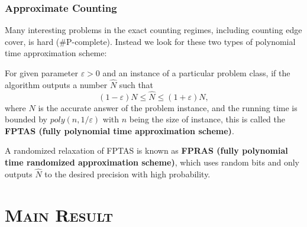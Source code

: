 \documentclass[mathserif]{beamer}
\newcommand{\eps}{\varepsilon}
\begin{document}
\begin{frame}
	\frametitle{Approximate Counting}
	Many interesting problems in the exact counting regimes, including counting edge cover, is hard (\#P-complete).
	Instead we look for these two types of polynomial time approximation scheme:
	\pause
	\begin{definition}[FPTAS]
		For given parameter $\eps > 0$ and an instance of a particular problem class, if the algorithm outputs a number $\hat{N}$ such that 
\[(1-\eps) N \leq \hat{N} \leq (1+\eps) N,\]
 where $N$ is the accurate answer of the problem instance, and the running time is bounded by $poly(n, 1/ \eps)$ with $n$ being the size of instance, this is called the {\bf FPTAS (fully polynomial time approximation scheme)}.

	\end{definition}
		A randomized relaxation of FPTAS is known as {\bf FPRAS (fully polynomial time randomized approximation scheme)}, which uses random bits and only outputs $\hat{N}$ to the desired precision with high probability.
\end{frame}

%	


\section{\scshape Main Result}
\end{document}
